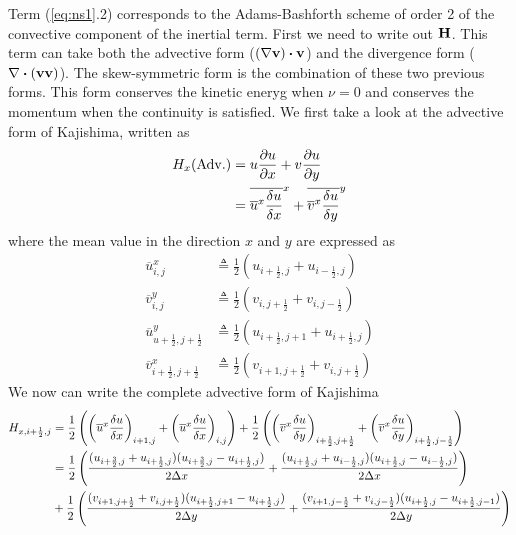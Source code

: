 \documentclass[a4paper,10pt]{scrartcl}
\begin{document}
Term (\ref{eq:ns1}.2) corresponds to the Adams-Bashforth scheme of order 2 of the convective component of the inertial term. First we need to write out $\vb{H}$.  This term can take both the advective form ($(\vb{\nabla}\vb{v})\vdot\vb{v}$) and the divergence form ($\vb{\nabla}\vdot(\vb{v}\vb{v})$). The skew-symmetric form is the combination of these two previous forms. This form conserves the kinetic eneryg when $\nu=0$ and conserves the momentum when the continuity is satisfied. We first take a look at the advective form of Kajishima, written as
\begin{align} 
    H_x(\mathrm{Adv.}) &= u\pdv{u}{x} + v\pdv{u}{y} \\
        &= \overline{\overline{u}^x\fdv{u}{x}}^x + \overline{\overline{v}^x\fdv{u}{y}}^y \\
\end{align}
where the mean value in the direction $x$ and $y$ are expressed as
\begin{align}
    \overline{u}^x_{i,j} &\triangleq \frac{1}{2}\left(u_{i+\frac{1}{2},j} + u_{i-\frac{1}{2},j}\right) \\
    \overline{v}^y_{i,j} &\triangleq \frac{1}{2}\left(v_{i,j+\frac{1}{2}} + v_{i,j-\frac{1}{2}}\right) \\
    \overline{u}^y_{u+\frac{1}{2},j+\frac{1}{2}} &\triangleq \frac{1}{2}\left(u_{i+\frac{1}{2},j+1} + u_{i+\frac{1}{2},j}\right) \\
    \overline{v}^x_{i+\frac{1}{2},j+\frac{1}{2}} &\triangleq \frac{1}{2}\left(v_{i+1,j+\frac{1}{2}} + v_{i,j+\frac{1}{2}}\right) 
\end{align}
We now can write the complete advective form of Kajishima
\begin{align}
    H_{x,i+\frac{1}{2},j} &= \frac{1}{2}\left(\left(\overline{u}^x\fdv{u}{x}\right)_{i+1,j} + \left(\overline{u}^x\fdv{u}{x}\right)_{i,j}\right) + \frac{1}{2}\left(\left(\overline{v}^x\fdv{u}{y}\right)_{i+\frac{1}{2},j+\frac{1}{2}} + \left(\overline{v}^x\fdv{u}{y}\right)_{i+\frac{1}{2},j-\frac{1}{2}}\right) \\
        &= \frac{1}{2}\left(\frac{(u_{i+\frac{3}{2},j} + u_{i+\frac{1}{2},j})(u_{i+\frac{3}{2},j}-u_{i+\frac{1}{2},j})}{2\Delta x} + \frac{(u_{i+\frac{1}{2},j} + u_{i-\frac{1}{2},j})(u_{i+\frac{1}{2},j}-u_{i-\frac{1}{2},j})}{2\Delta x}\right) \nonumber\\
        &+ \frac{1}{2}\left(\frac{(v_{i+1,j+\frac{1}{2}} + v_{i,j+\frac{1}{2}})(u_{i+\frac{1}{2},j+1} - u_{i+\frac{1}{2},j})}{2\Delta y} + \frac{(v_{i+1,j-\frac{1}{2}} + v_{i,j-\frac{1}{2}})(u_{i+\frac{1}{2},j} - u_{i+\frac{1}{2},j-1})}{2\Delta y}\right)
\end{align}
\end{document}
